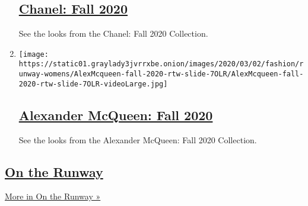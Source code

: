 \begin{enumerate}
  \hypertarget{chanel-fall-2020}{%
  \subsection{\texorpdfstring{\href{/slideshow/2020/03/03/fashion/runway-womens/chanel-fall-2020.html}{Chanel:
  Fall 2020}}{Chanel: Fall 2020}}\label{chanel-fall-2020}}

  See the looks from the Chanel: Fall 2020 Collection.
\item
  \texttt{[image: https://static01.graylady3jvrrxbe.onion/images/2020/03/02/fashion/runway-womens/AlexMcqueen-fall-2020-rtw-slide-7OLR/AlexMcqueen-fall-2020-rtw-slide-7OLR-videoLarge.jpg]}

  \hypertarget{alexander-mcqueen-fall-2020}{%
  \subsection{\texorpdfstring{\href{/slideshow/2020/03/02/fashion/runway-womens/alexander-mcqueen-fall-2020.html}{Alexander
  McQueen: Fall
  2020}}{Alexander McQueen: Fall 2020}}\label{alexander-mcqueen-fall-2020}}

  See the looks from the Alexander McQueen: Fall 2020 Collection.
\end{enumerate}

\hypertarget{on-the-runway}{%
\subsection{\texorpdfstring{\href{/column/on-the-runway}{On the
Runway}}{On the Runway}}\label{on-the-runway}}

\href{/column/on-the-runway}{More in On the Runway »}

